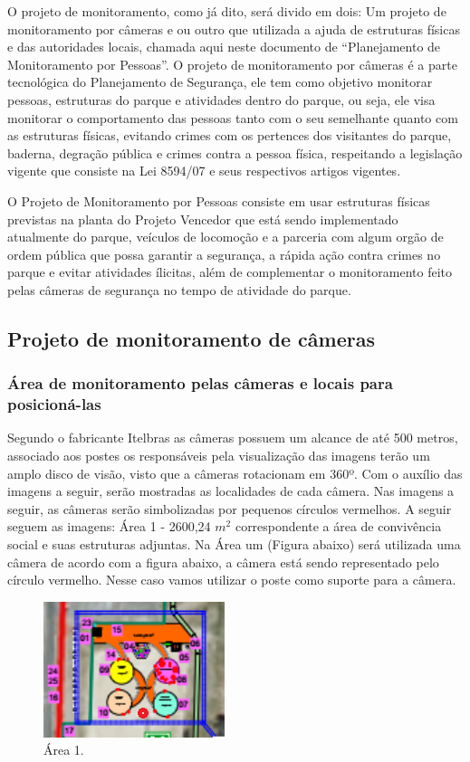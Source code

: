 	O projeto de monitoramento, como já dito, será divido em dois: Um projeto de monitoramento por câmeras e ou outro que utilizada a ajuda de estruturas  físicas e das autoridades locais,  chamada aqui neste documento de “Planejamento de Monitoramento por Pessoas”. O projeto de monitoramento  por câmeras é a parte tecnológica  do Planejamento de Segurança, ele tem como objetivo monitorar  pessoas, estruturas do parque e atividades dentro do parque, ou seja, ele visa monitorar o comportamento das pessoas tanto com o seu semelhante quanto com as estruturas físicas, evitando crimes com os pertences dos visitantes do parque, baderna, degração pública e crimes contra a pessoa física, respeitando a legislação vigente que consiste na Lei 8594/07 e seus respectivos artigos vigentes.
	
	O Projeto de Monitoramento por Pessoas consiste em usar estruturas físicas previstas na planta do Projeto Vencedor que está sendo implementado atualmente do parque, veículos de locomoção e a parceria com algum orgão de ordem pública que possa garantir a segurança, a rápida ação contra crimes no parque e evitar atividades ílicitas, além de complementar o monitoramento feito pelas câmeras de segurança no tempo de atividade do parque.

\subsection{Projeto de monitoramento de câmeras}

\subsubsection{Área de monitoramento pelas câmeras e locais para posicioná-las}

	Segundo o fabricante Itelbras as câmeras possuem um alcance de até 500 metros, associado aos postes os responsáveis pela visualização das imagens terão um amplo disco de visão, visto que a câmeras rotacionam em 360º. Com o auxílio das imagens a seguir, serão mostradas as localidades de cada câmera. Nas imagens a seguir, as câmeras serão simbolizadas por pequenos círculos vermelhos. A seguir seguem as imagens:
	Área 1 - 2600,24 $m^{2}$ correspondente a área de convivência social e suas estruturas adjuntas. Na Área um (Figura abaixo) será utilizada uma câmera de acordo com a figura abaixo, a câmera está sendo representado pelo círculo vermelho. Nesse caso vamos utilizar o poste como suporte para a câmera.
	
\begin{figure}[H]
	 \centering
	\label{Área 1}
	 \includegraphics[keepaspectratio=true,scale=0.8]{monitoramento/1.png}
	 \caption{Área 1.}
\end{figure}

